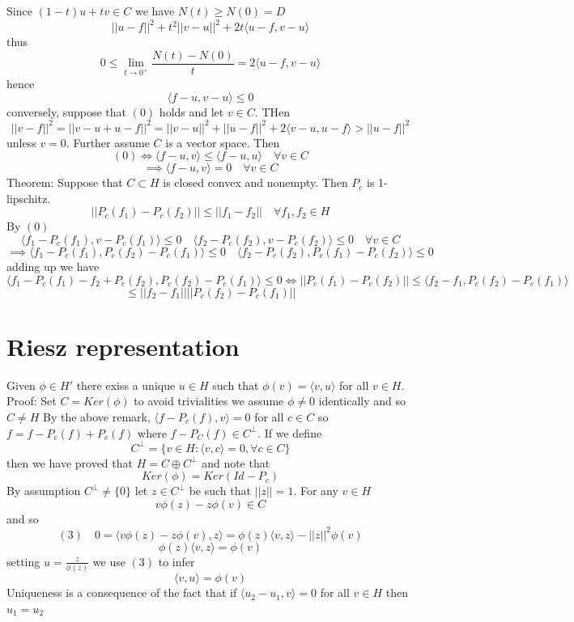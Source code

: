 \documentclass[11pt]{article}
\begin{document}
Since  $(1-t)u + tv \in C$ we have  $N(t) \ge N(0) = D$
\[
||u-f||^2 + t^2 ||v -u||^2 + 2t \langle u -f, v- u \rangle
\] 
thus
\[
0 \le \lim_{t\to 0^{+}} \frac{N(t) - N(0)}{t} = 2 \langle u - f, v -u \rangle
\] 
hence
\[
\langle f -u , v - u \rangle \le 0
\] 
conversely, suppose that $(0)$ holds and let  $v \in C$. THen
 \[
||v- f||^2 = || v- u + u - f||^2 = || v- u||^2 + || u - f||^2 + 2 \langle v - u, u - f \rangle > ||u - f||^2
\] 
unless $ v = 0$.
Further assume  $C$ is a vector space.
Then 
\[
    (0) \iff \langle f -u, v \rangle \le \langle f - u,u \rangle \quad \forall v \in C
\] 
\[
    \implies \langle f - u, v \rangle = 0 \quad \forall v \in C
\] 
Theorem:
Suppose that $C \subset H$ is closed convex and nonempty. Then $P_c$ is 1-lipschitz.
 \[
||P_c(f_1) - P_c(f_2) || \le ||f_1 - f_2|| \quad \forall f_1,f_2 \in H
\] 
By $(0)$ 
 \[
\langle f_1 - P_c(f_1) , v - P_c(f_1)\rangle \le 0 \quad \langle f_2 - P_c(f_2) , v - P_c(f_2) \rangle \le 0 \quad \forall v \in C
\] 
\[
\implies \langle f_1 - P_c(f_1) , P_c(f_2) - P_c(f_1) \rangle \le 0 \quad \langle f_2 - P_c(f_2) , P_c(f_1) - P_c(f_2) \rangle \le 0
\] 
adding up we have 
\[
\langle f_1 - P_c(f_1) - f_2 + P_c(f_2) , P_c(f_2) - P_c(f_1) \rangle \le 0 \iff  || P_c(f_1) - P_c(f_2) || \le \langle f_2 - f_1, P_c(f_2) - P_c(f_1) \rangle 
\] 
\[
\le ||f_2 - f_1|| || P_c(f_2) - P_c(f_1) ||
\] 

\section{Riesz representation}
Given $\phi \in H'$ there exiss a unique $u \in H$ such that  $\phi(v) = \langle v, u \rangle$ for all $v \in H$.
Proof: Set  $C = Ker(\phi)$ to avoid trivialities we assume $\phi \ne 0$ identically and so $C \ne H$
By the above remark,  $ \langle f - P_c(f), v \rangle = 0$ for all $ c \in C$ so  $f = f - P_c(f) + P_c(f)$ where  $f - P_C(f) \in C^{\perp}$.
If we define 
\[
    C^{\perp} = \{v \in H : \langle v, c \rangle = 0, \forall c \in C\}
\] 
then we have proved that  $H = C \oplus C^{\perp}$ and note that
\[
Ker(\phi) = Ker(Id - P_c)
\] 
By assumption $C^{\perp} \ne \{0\}$ let $z \in C^{\perp}$ be such that $||z|| = 1$.
For any  $v \in H$
 \[
v \phi(z)  - z \phi(v) \in C
\] 
and so
\[
    (3) \quad 0 = \langle v \phi(z) - z \phi(v), z \rangle = \phi(z) \langle v, z \rangle - ||z||^2 \phi(v) 
\] 
\[
\phi(z) \langle v,z \rangle = \phi(v)
\] 
setting $u = \frac{z}{\phi(z)}$ we use $(3)$ to infer
\[
    \langle v, u \rangle = \phi(v)
\] 
Uniqueness is a consequence of the fact that if $\langle u_2 - u_1, v \rangle = 0$ for all $v \in H$ then  $u_1 = u_2$
\end{document}
